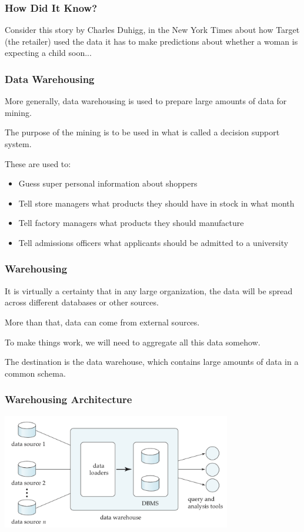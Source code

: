 \begin{frame}
\frametitle{How Did It Know?}

Consider this story by Charles Duhigg, in the New York Times about how Target (the retailer) used the data it has to make predictions about whether a woman is expecting a child soon...

\end{frame}

\begin{frame}
\frametitle{Data Warehousing}

More generally, data warehousing is used to prepare large amounts of data for mining.

The purpose of the mining is to be used in what is called a \alert{decision support system}. 

These are used to:

\begin{itemize}
 \item Guess super personal information about shoppers
 \item Tell store managers what products they should have in stock in what month
 \item Tell factory managers what products they should manufacture
 \item Tell admissions officers what applicants should be admitted to a university
\end{itemize}

\end{frame}


\begin{frame}
\frametitle{Warehousing}

It is virtually a certainty that in any large organization, the data will be spread across different databases or other sources. 

More than that, data can come from external sources.

To make things work, we will need to aggregate all this data somehow. 

The destination is the data warehouse, which contains large amounts of data in a common schema.

\end{frame}

\begin{frame}
\frametitle{Warehousing Architecture}

\begin{center}
\includegraphics[width=0.75\textwidth]{images/warehouse}
\end{center}


\end{frame}


